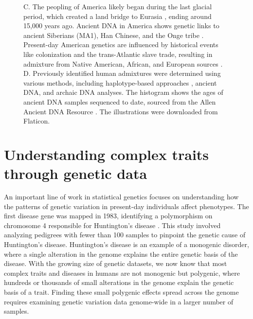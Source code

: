 \begin{figure}[h!]
{    %
    C. The peopling of America likely began during the last glacial period, which created a land bridge to Eurasia \cite{severinghaus1999abrupt}, ending around 15,000 years ago. Ancient DNA in America shows genetic links to ancient Siberians (MA1), Han Chinese, and the Onge tribe \cite{skoglund2016genomic}. Present-day American genetics are influenced by historical events like colonization and the trans-Atlantic slave trade, resulting in admixture from Native American, African, and European sources \cite{smith2004high, price2009sensitive}.
    D. Previously identified human admixtures were determined using various methods, including haplotype-based approaches \cite{hellenthal2014genetic, loh2013inferring, moorjani2011history, patterson2012ancient}, ancient DNA, and archaic DNA analyses. The histogram shows the ages of ancient DNA samples sequenced to date, sourced from the Allen Ancient DNA Resource \cite{mallick2024allen}.
    The illustrations were downloaded from Flaticon.
    }
    \label{fig:gb-intro}
\end{figure}


\clearpage

\section{Understanding complex traits through genetic data}

An important line of work in statistical genetics focuses on understanding how the patterns of genetic variation in present-day individuals affect phenotypes. The first disease gene was mapped in 1983, identifying a polymorphism on chromosome 4 responsible for Huntington's disease \cite{Gusella1983}. This study involved analyzing pedigrees with fewer than 100 samples to pinpoint the genetic cause of Huntington's disease. Huntington's disease is an example of a monogenic disorder, where a single alteration in the genome explains the entire genetic basis of the disease. With the growing size of genetic datasets, we now know that most complex traits and diseases in humans are not monogenic but polygenic, where hundreds or thousands of small alterations in the genome explain the genetic basis of a trait. Finding these small polygenic effects spread across the genome requires examining genetic variation data genome-wide in a larger number of samples.

